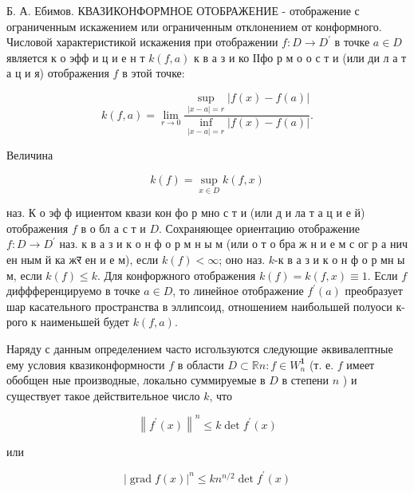 \documentclass[10pt]{article}
\begin{document}
Б. А. Ебимов. КВАЗИКОНФОРМНОЕ ОТОБРАЖЕНИЕ - отображение с ограниченным искажением или ограниченным отклонением от конформного. Числовой характеристикой искажения при отображении $f: D \rightarrow D^{\prime}$ в точке $a \in D$ является к о эфф и ц и е н т $k(f, a)$ к в а з и ко ІІ$ф о$ р м о о с т и (или ди л а т а ц и я) отображения $f$ в этой точке:



\[

k(f, a)=\lim _{r \rightarrow 0} \frac{\sup _{|x-a|=r}|f(x)-f(a)|}{\inf _{|x-a|=r}|f(x)-f(a)|} .

\]



Величина



\[

k(f)=\sup _{x \in D} k(f, x)

\]



наз. К о эф ф ициентом квази кон фо р мно с т и (или д и ла т а ц и е й) отображения $f$ в о бл а с т и $D$. Сохраняющее ориентацию отображение $f: D \rightarrow D^{\prime}$ наз. к в а з и к о н ф о р м н ы м (или о т о бра ж н и е м с ог р а нич ен ным й ка жर ен и е м), если $k(f)<\infty$; оно наз. $k$-к в а з и к о н ф о р мн ы м, если $k(f) \leqslant k$. Для конфоржного отображения $k(f)=k(f, x) \equiv 1$. Если $f$ диффференцируемо в точке $a \in D$, то линейное отображение $f^{\prime}(a)$ преобразует шар касательного пространства в эллипсоид, отношением наибольшей полуоси к-рого к наименьшей будет $k(f, a)$.



Наряду с данным определением часто исгользуются следующие әквивалептные ему условия квазиконформности $f$ в области $D \subset \mathbb{R} n: f \in W_{n}^{\mathbf{1}}$ (т. е. $f$ имеет обобщен ные производные, локально суммируемые в $D$ в степени $n$ ) и существует такое действительное число $k$, что



\[

\left\|f^{\prime}(x)\right\|^{n} \leqslant k \operatorname{det} f^{\prime}(x)

\]



или



\[

|\operatorname{grad} f(x)|^{n} \leqslant k n^{n / 2} \operatorname{det} f^{\prime}(x)

\]
\end{document}
